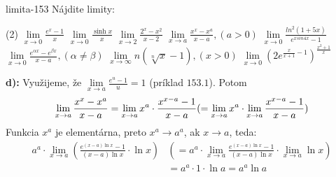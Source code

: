 \begin{defproblem}{limita-153}
Nájdite limity:
\begin{tasks}(2)
    \task $\lim\limits_{{x \rightarrow 0}} \frac{e^x-1}{x}$
    \task $\lim\limits_{{x \rightarrow 0}} \frac{\sinh x}{x}$
    \task $\lim\limits_{{x \rightarrow 2}} \frac{2^x-x^2}{x-2}$
    \task $\lim\limits_{{x \rightarrow a}} \frac{x^x-x^a}{x-a},(a>0)$
    \task $\lim\limits_{{x \rightarrow 0}} \frac{ln^2 (1+5x)}{e^{x sin 4x}-1}$
    \task $\lim\limits_{{x \rightarrow 0}} \frac{e^{\alpha x}-e^{\beta x}}{x-a},(\alpha \neq \beta)$
    \task $\lim\limits_{{x \rightarrow \infty}}n(\sqrt[n]{x}-1),(x>0)$
    \task $\lim\limits_{{x \rightarrow 0}} ({2e^{\frac{x}{x+1}-1}})^{\frac{x^2+1}{x}}$
\end{tasks}

\begin{solution}
    \textbf{d):}
    Využijeme, že $\lim\limits_{x \rightarrow a}\frac{e^u-1}{u}=1$ (príklad
    $153.1$). Potom
    \[
        \lim\limits_{x \rightarrow a}\frac{x^x-x^a}{x-a}
        = \lim\limits_{x \rightarrow a}x^a \cdot \frac{x^{x-a}-1}{x-a}
        (=\lim\limits_{x \rightarrow a}x^a \cdot \lim\limits_{x \rightarrow a}\frac{x^{x-a}-1}{x-a}) \\
    \]
    Funkcia $x^a$ je elementárna, preto $x^a \rightarrow a^a$, ak $x \rightarrow
    a$, teda:
    \begin{align*}
        a^a \cdot \lim\limits_{x \rightarrow a}(\frac{e^{(x-a)\ln
            x}-1}{(x-a)\ln x}\cdot \ln x)
        &(=a^a \cdot \lim\limits_{x \rightarrow a}\frac{e^{(x-a)\ln x}-1}{(x-a)\ln x}\cdot \lim\limits_{x \rightarrow a}\ln
            x) \\
        &= a^a \cdot 1 \cdot \ln a
        = a^a \ln a
    \end{align*}
\end{solution}
\end{defproblem}

